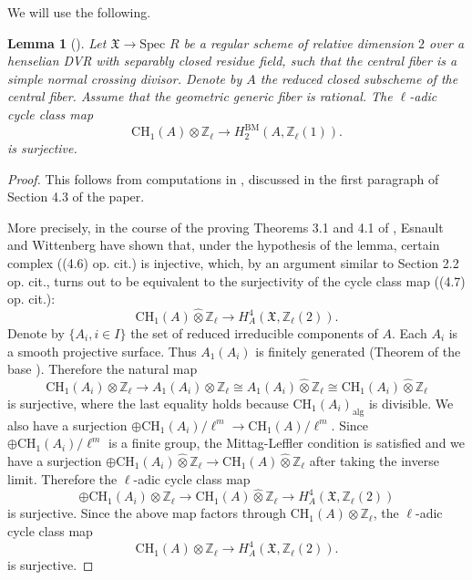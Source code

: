 \documentclass{amsart}
\newtheorem{lem}[theorem]{Lemma}
\theoremstyle{definition}
\theoremstyle{remark}
\newcommand{\mbb}{\mathbb}
\newcommand{\ZZ}{\mbb{Z}}
\newcommand{\SP}{\text{Spec }}
\begin{document}
We will use the following.
\begin{lem}[{\cite[First paragraph of Section 4.3]{WittenbergEsnault_0_cycle}}]\label{lem:surj_fiber}
    Let $\mathfrak{X} \to \SP R$ be a regular scheme of relative dimension $2$ over a henselian DVR with separably closed residue field, such that the central fiber is a simple normal crossing divisor. 
    Denote by $A$ the reduced closed subscheme of the central fiber. Assume that the geometric generic fiber is rational.
The $\ell$-adic cycle class map
\[
\text{CH}_1(A) {\otimes}\ZZ_\ell \to H_{2}^{\text{BM}}(A, \ZZ_\ell(1)).
\]
is surjective.
\end{lem}
\begin{proof}
    This follows from computations in \cite{WittenbergEsnault_0_cycle}, discussed in the first paragraph of Section 4.3 of the paper. 
    
More precisely, in the course of the proving Theorems 3.1 and 4.1 of \cite{WittenbergEsnault_0_cycle}, Esnault and Wittenberg have shown that, under the hypothesis of the lemma, certain complex ((4.6) op. cit.) is injective, which, by an argument similar to Section 2.2 op. cit., turns out to be equivalent to the surjectivity of the cycle class map ((4.7) op. cit.):
\[
\text{CH}_1(A) \hat{\otimes}\ZZ_\ell \to H^{4}_A(\mathfrak{X}, \ZZ_\ell(2)).
\]
 Denote by $\{A_i, i\in I\}$ the set of reduced irreducible components of $A$. Each $A_i$ is a smooth projective surface.
Thus $A_1(A_i)$ is finitely generated (Theorem of the base \cite[XIII Th\'eor\`eme 5.1]{SGA6}).
Therefore the natural map $$\text{CH}_1(A_i)\otimes \ZZ_\ell \to A_1(A_i) \otimes \ZZ_\ell \cong A_1(A_i)\hat{\otimes}\ZZ_\ell\cong \text{CH}_1(A_i)\hat{\otimes} \ZZ_\ell$$ is surjective, where the last equality holds because $\text{CH}_1(A_i)_\text{alg}$ is divisible.
We also have a surjection $\oplus \text{CH}_1(A_i)/\ell^m \to \text{CH}_1(A)/\ell^m$. Since $\oplus \text{CH}_1(A_i)/\ell^m$ is a finite group, the Mittag-Leffler condition is satisfied and we have a surjection $\oplus \text{CH}_1(A_i)\hat{\otimes} \ZZ_\ell \to \text{CH}_1(A) \hat{\otimes} \ZZ_\ell$ after taking the inverse limit.
Therefore the $\ell$-adic cycle class map
\[
\oplus \text{CH}_1(A_i)\otimes \ZZ_\ell \to \text{CH}_1(A) \hat{\otimes}\ZZ_\ell \to H^{4}_A(\mathfrak{X}, \ZZ_\ell(2))
\]
is surjective. 
Since the above map factors through $\text{CH}_1(A) {\otimes}\ZZ_\ell$, the $\ell$-adic cycle class map
\[
\text{CH}_1(A) {\otimes}\ZZ_\ell \to H^{4}_A(\mathfrak{X}, \ZZ_\ell(2)).
\]
is surjective.


\end{proof}
\end{document}
